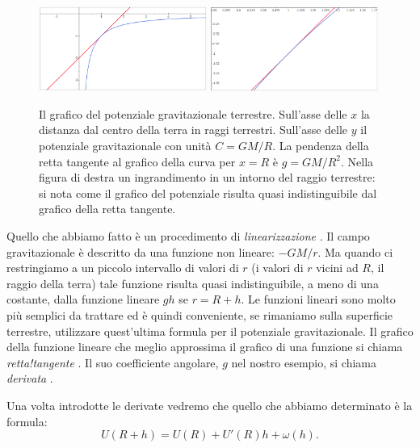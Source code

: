 \begin{figure}
\includegraphics[width=0.49\textwidth]{derivata_00.png}\hfill%
\includegraphics[width=0.49\textwidth]{derivata_01.png}
\label{fig:derivata}
\caption{Il grafico del potenziale gravitazionale terrestre.
Sull'asse delle $x$ la distanza dal centro della terra in raggi terrestri.
Sull'asse delle $y$ il potenziale gravitazionale con unità $C=GM/R$.
La pendenza della retta tangente al grafico della curva per $x=R$ è $g=GM/R^2$.
Nella figura di destra un ingrandimento in un intorno del raggio terrestre:
si nota come il grafico del potenziale risulta quasi indistinguibile dal
grafico della retta tangente.}
\end{figure}

Quello che abbiamo fatto è un procedimento di \emph{linearizzazione}%
%
. 
Il campo gravitazionale è descritto da una funzione non lineare: $-GM/r$.
Ma quando ci restringiamo a un piccolo intervallo di valori di $r$ 
(i valori di $r$ vicini ad $R$, il raggio della terra) tale funzione 
risulta quasi indistinguibile, a meno di una costante, dalla funzione 
lineare $gh$ se $r=R+h$.
Le funzioni lineari sono molto più semplici da trattare ed è quindi conveniente, 
se rimaniamo sulla superficie terrestre, utilizzare quest'ultima formula per 
il potenziale gravitazionale.
Il grafico della funzione lineare che meglio approssima il grafico di una 
funzione si chiama \emph{retta!tangente}%
%
. 
Il suo coefficiente angolare, $g$ nel nostro esempio, si chiama \emph{derivata}%
%
.

Una volta introdotte le derivate vedremo che quello che abbiamo
determinato è la formula:
\[
U(R+h) = U(R) + U'(R) h + \omega(h).
\]

